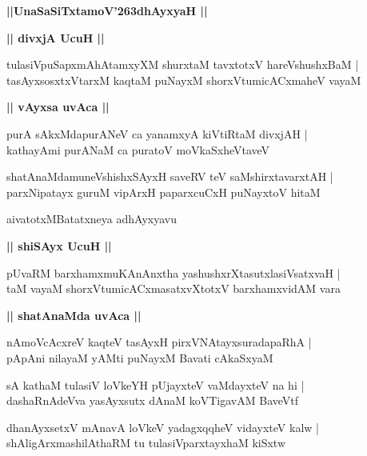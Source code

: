 \documentclass[twoside,12pt,openright]{book}
\def\S{\char'263}
\newcounter{shloka}[chapter]
\def\uvaca#1{\centerline{{\large\textbf{#1}}}}
\begin{document}
\begin{center}
{\LARGE\bfseries ||UnaSaSiTxtamoV\S dhAyxyaH || }
\end{center}

\uvaca{|| divxjA UcuH ||}

\begin{shloka}%
tulasiVpuSapxmAhAtamxyXM shurxtaM tavxtotxV hareVshushxBaM |\\
tasAyxsosxtxVtarxM kaqtaM puNayxM shorxVtumicACxmaheV vayaM 
\end{shloka}

\uvaca{|| vAyxsa uvAca ||}

\begin{shloka}%
purA sAkxMdapurANeV ca yanamxyA kiVtiRtaM divxjAH |\\
kathayAmi purANaM ca puratoV moVkaSxheVtaveV 
\end{shloka}

\begin{shloka}%
shatAnaMdamuneVshishxSAyxH saveRV teV saMshirxtavarxtAH |\\
parxNipatayx guruM vipArxH paparxcuCxH puNayxtoV hitaM 
\end{shloka}

\begin{center}
aivatotxMBatatxneya adhAyxyavu 
\end{center}

\uvaca{|| shiSAyx UcuH ||}

\begin{shloka}%
pUvaRM barxhamxmuKAnAnxtha yashushxrXtasutxlasiVsatxvaH |\\
taM vayaM shorxVtumicACxmasatxvXtotxV barxhamxvidAM vara
\end{shloka}

\uvaca{|| shatAnaMda uvAca ||}

\begin{shloka}%
nAmoVcAcxreV kaqteV tasAyxH pirxVNAtayxsuradapaRhA |\\
pApAni nilayaM yAMti puNayxM Bavati cAkaSxyaM 
\end{shloka}

\begin{shloka}%
sA kathaM tulasiV loVkeYH pUjayxteV vaMdayxteV na hi |\\
dashaRnAdeVva yasAyxsutx dAnaM koVTigavAM BaveVtf
\end{shloka}

\begin{shloka}%
dhanAyxsetxV mAnavA loVkeV yadagxqqheV vidayxteV kalw |\\
shAligArxmashilAthaRM tu tulasiVparxtayxhaM kiSxtw
\end{shloka}
\end{document}
